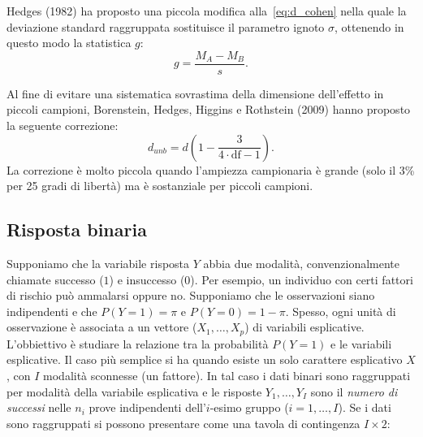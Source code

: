 Hedges (1982) ha proposto una piccola modifica alla~\eqref{eq:d_cohen} nella quale la deviazione standard raggruppata sostituisce il parametro ignoto $\sigma$, ottenendo in questo modo la statistica $g$:
\begin{equation}
g = \frac{M_A - M_B}{s}.
\label{eq:g_eff_size}
\end{equation}

Al fine di evitare una sistematica sovrastima della dimensione dell'effetto in piccoli campioni, Borenstein, Hedges, Higgins e Rothstein (2009) hanno proposto la seguente correzione:
\begin{equation}
d_{unb} = d \left(1 - \frac{3}{4 \cdot \text{df} - 1} \right).
\label{eq:d_unbiased}
\end{equation}
La correzione è molto piccola quando l'ampiezza campionaria è grande (solo il 3\% per 25 gradi di libertà) ma è sostanziale per piccoli campioni.

\subsection{Risposta binaria}
\label{sec:binary_reponse_eff_size}

Supponiamo che la variabile risposta  $Y$ abbia due modalità, convenzionalmente chiamate successo ($1$) e insuccesso ($0$).
Per esempio, un individuo con certi fattori di rischio può ammalarsi oppure no.
Supponiamo che le osservazioni siano indipendenti e che $P(Y=1) = \pi$ e $P(Y=0) = 1-\pi$.
Spesso, ogni unità di osservazione è associata a un vettore ($X_1, \dots, X_p$) di variabili esplicative. 
L'obbiettivo è studiare la relazione tra la probabilità $P(Y=1)$ e le variabili
esplicative.
Il caso più semplice si ha quando esiste un solo carattere esplicativo $X$, con $I$  modalità sconnesse (un fattore). 
In tal caso i dati binari sono raggruppati per modalità della variabile esplicativa e le risposte
$
Y_1, \dots, Y_I
$
sono il \emph{numero di successi} nelle $n_i$ prove indipendenti dell'$i$-esimo gruppo ($i = 1, \dots, I$).
Se i dati sono raggruppati si possono  presentare come una tavola di contingenza $I \times 2$:

